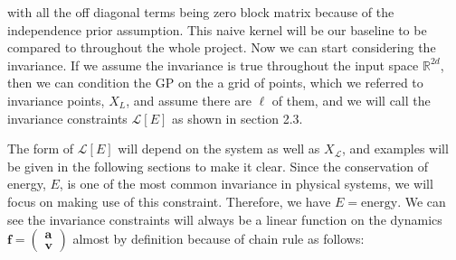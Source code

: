 \documentclass{statsmsc}
\begin{document}
with all the off diagonal terms being zero block matrix because of the independence prior assumption.
This naive kernel will be our baseline to be compared to throughout the whole project.
Now we can start considering the invariance. 
If we assume the invariance is true throughout the input space $\mathbb{R}^{2d}$, then we can condition the GP on the a grid of points, which we referred to invariance points, $X_L$, and assume there are $\ell$ of them, and we will call the invariance constraints $\mathcal{L}[E]$ as shown in section 2.3.

The form of $\mathcal{L}[E]$ will depend on the system as well as $X_\mathcal{L}$, and examples will be given in the following sections to make it clear.
Since the conservation of energy, $E$, is one of the most common invariance in physical systems, we will focus on making use of this constraint.
Therefore, we have $E=\text{energy}.$
We can see the invariance constraints will always be a linear function on the dynamics $\mathbf{f}=\begin{pmatrix}
  \mathbf{a} \\ \mathbf{v}
\end{pmatrix}$ almost by definition because of chain rule as follows: 
\end{document}

